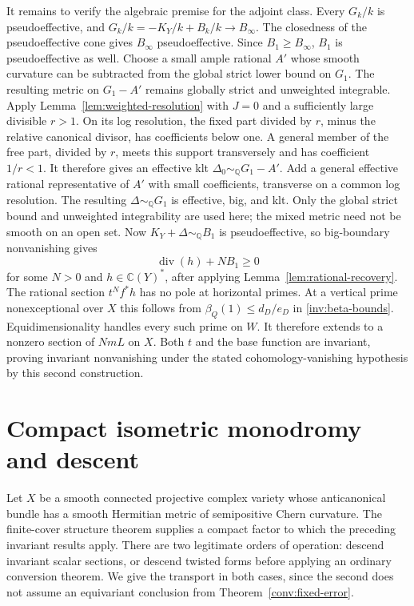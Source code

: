 It remains to verify the algebraic premise for the adjoint class.
Every $G_k/k$ is pseudoeffective, and
$G_k/k=-K_Y/k+B_k/k\to B_\infty$.
The closedness of the pseudoeffective cone gives $B_\infty$
pseudoeffective.  Since $B_1\ge B_\infty$,
$B_1$ is pseudoeffective as well.  Choose a small ample rational $A'$
whose smooth curvature can be subtracted from the global strict lower
bound on $G_1$.  The resulting metric on $G_1-A'$ remains globally
strict and unweighted integrable.  Apply
Lemma~\ref{lem:weighted-resolution} with $J=0$ and a sufficiently
large divisible $r>1$.  On its log resolution, the fixed part divided
by $r$, minus the relative canonical divisor, has coefficients below
one.  A general member of the free part, divided by $r$, meets this
support transversely and has coefficient $1/r<1$.  It therefore gives
an effective klt $\Delta_0\sim_{\mathbb Q}G_1-A'$.
Add a general effective rational representative of $A'$ with small
coefficients, transverse on a common log resolution.  The resulting
$\Delta\sim_{\mathbb Q}G_1$ is effective, big, and klt.
Only the global strict bound and unweighted integrability are used
here; the mixed metric need not be smooth on an open set.
Now $K_Y+\Delta\sim_{\mathbb Q}B_1$ is pseudoeffective, so
big-boundary nonvanishing \cite[Theorem~D]{BCHM2010} gives
\[
 \operatorname{div}(h)+NB_1\ge0
\]
for some $N>0$ and $h\in\mathbb C(Y)^*$, after applying Lemma~\ref{lem:rational-recovery}.
The rational section $t^Nf^*h$ has no pole at horizontal primes.  At a
vertical prime nonexceptional over $X$ this follows from
$\beta_Q(1)\le d_D/e_D$ in \eqref{inv:beta-bounds}.
Equidimensionality handles every such prime on $W$.
It therefore extends to a nonzero section of $NmL$ on $X$.
Both $t$ and the base function are invariant, proving invariant
nonvanishing under the stated cohomology-vanishing hypothesis by this
second construction.

\section{Compact isometric monodromy and descent}
\label{inv:isometric-descent}

Let $X$ be a smooth connected projective complex variety whose
anticanonical bundle has a smooth Hermitian metric of semipositive
Chern curvature. The finite-cover structure theorem supplies a
compact factor to which the preceding invariant results apply.
There are two legitimate orders of operation: descend
invariant scalar sections, or descend twisted forms before applying an
ordinary conversion theorem.  We give the transport in both cases,
since the second does not assume an equivariant conclusion from
Theorem~\ref{conv:fixed-error}.

